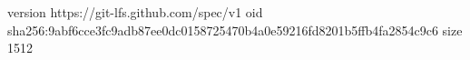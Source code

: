 version https://git-lfs.github.com/spec/v1
oid sha256:9abf6cce3fc9adb87ee0dc0158725470b4a0e59216fd8201b5ffb4fa2854c9c6
size 1512
